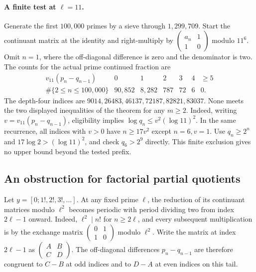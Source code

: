\documentclass[11pt,a4paper]{article}
\begin{document}
\paragraph{A finite test at \(\ell=11\).}
Generate the first \(100{,}000\) primes by a sieve through \(1{,}299{,}709\). Start the continuant matrix at the identity and right-multiply by
\(\left(\begin{smallmatrix}a_n&1\\1&0\end{smallmatrix}\right)\) modulo \(11^6\).
Omit \(n=1\), where the off-diagonal difference is zero and the denominator is two. The counts for the actual prime continued fraction are
\[
\begin{array}{c|rrrrrr}
v_{11}(p_n-q_{n-1}) &0&1&2&3&4&\ge5\\ \hline
\#\{2\le n\le100{,}000\} &90{,}852&8{,}282&787&72&6&0 .
\end{array}
\]
The depth-four indices are \(9014,26483,46137,72187,82821,83037\). None meets the two displayed inequalities of the theorem for any \(m\ge2\). Indeed, writing \(v=v_{11}(p_n-q_{n-1})\), eligibility implies \(\log q_n\le v^2(\log 11)^2\). In the same recurrence, all indices with \(v>0\) have \(n\ge17v^2\) except \(n=6,v=1\). Use \(q_n\ge2^n\) and \(17\log2>(\log11)^2\), and check \(q_6>2^9\) directly. This finite exclusion gives no upper bound beyond the tested prefix.
\subsection{An obstruction for factorial partial quotients}
Let \(y=[0;1!,2!,3!,\ldots]\). At any fixed prime \(\ell\), the reduction
of its continuant matrices modulo \(\ell^2\) becomes periodic with period
dividing two from index \(2\ell-1\) onward. Indeed, \(\ell^2\mid n!\)
for \(n\ge2\ell\), and every subsequent multiplication is by the exchange
matrix \(\left(\begin{smallmatrix}0&1\\1&0\end{smallmatrix}\right)\)
modulo \(\ell^2\).
Write the matrix at index \(2\ell-1\) as
\(\left(\begin{smallmatrix}A&B\\C&D\end{smallmatrix}\right)\).
The off-diagonal differences \(p_n-q_{n-1}\) are therefore congruent to
\(C-B\) at odd indices and to \(D-A\) at even indices on this tail.
\end{document}
